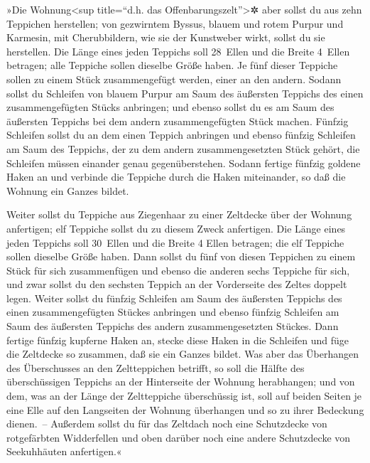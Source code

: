  »Die Wohnung\textless sup title=``d.h. das
Offenbarungszelt''\textgreater✲ aber sollst du aus zehn Teppichen
herstellen; von gezwirntem Byssus, blauem und rotem Purpur und Karmesin,
mit Cherubbildern, wie sie der Kunstweber wirkt, sollst du sie
herstellen.  Die Länge eines jeden Teppichs soll 28~Ellen
und die Breite 4~Ellen betragen; alle Teppiche sollen dieselbe Größe
haben.  Je fünf dieser Teppiche sollen zu einem Stück
zusammengefügt werden, einer an den andern.  Sodann sollst
du Schleifen von blauem Purpur am Saum des äußersten Teppichs des einen
zusammengefügten Stücks anbringen; und ebenso sollst du es am Saum des
äußersten Teppichs bei dem andern zusammengefügten Stück machen.
 Fünfzig Schleifen sollst du an dem einen Teppich
anbringen und ebenso fünfzig Schleifen am Saum des Teppichs, der zu dem
andern zusammengesetzten Stück gehört, die Schleifen müssen einander
genau gegenüberstehen.  Sodann fertige fünfzig goldene
Haken an und verbinde die Teppiche durch die Haken miteinander, so daß
die Wohnung ein Ganzes bildet.

 Weiter sollst du Teppiche aus Ziegenhaar zu einer
Zeltdecke über der Wohnung anfertigen; elf Teppiche sollst du zu diesem
Zweck anfertigen.  Die Länge eines jeden Teppichs soll
30~Ellen und die Breite 4 Ellen betragen; die elf Teppiche sollen
dieselbe Größe haben.  Dann sollst du fünf von diesen
Teppichen zu einem Stück für sich zusammenfügen und ebenso die anderen
sechs Teppiche für sich, und zwar sollst du den sechsten Teppich an der
Vorderseite des Zeltes doppelt legen.  Weiter sollst du
fünfzig Schleifen am Saum des äußersten Teppichs des einen
zusammengefügten Stückes anbringen und ebenso fünfzig Schleifen am Saum
des äußersten Teppichs des andern zusammengesetzten Stückes.
 Dann fertige fünfzig kupferne Haken an, stecke diese
Haken in die Schleifen und füge die Zeltdecke so zusammen, daß sie ein
Ganzes bildet.  Was aber das Überhangen des Überschusses
an den Zeltteppichen betrifft, so soll die Hälfte des überschüssigen
Teppichs an der Hinterseite der Wohnung herabhangen;  und
von dem, was an der Länge der Zeltteppiche überschüssig ist, soll auf
beiden Seiten je eine Elle auf den Langseiten der Wohnung überhangen und
so zu ihrer Bedeckung dienen.~--  Außerdem sollst du für
das Zeltdach noch eine Schutzdecke von rotgefärbten Widderfellen und
oben darüber noch eine andere Schutzdecke von Seekuhhäuten anfertigen.«


